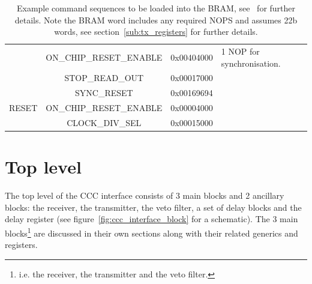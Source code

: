 \begin{table}
\begin{center}
\begin{tabular}{c|c|c|l}
              & ON\_CHIP\_RESET\_ENABLE  & 0x00404000 & 1 NOP for synchronisation. \\
              & STOP\_READ\_OUT          & 0x00017000 & \\
            \hline
            \multirow{3}{*}{RESET} 
              & SYNC\_RESET              & 0x00169694 & \\
              & ON\_CHIP\_RESET\_ENABLE  & 0x00004000 & \\
              & CLOCK\_DIV\_SEL          & 0x00015000 & \\
        \end{tabular}
        \end{center}
        \caption{Example command sequences to be loaded into the BRAM, see~\cite{lpd_manual} for further details. Note the BRAM word includes any required NOPS and assumes 22b words, see section~\ref{sub:tx_registers} for further details.}
        \label{tab:basic_tx_bram_vals}
    \end{table}
    \chapter{Top level} %
    \label{cha:top_level}
    The top level of the CCC interface consists of 3 main blocks and 2 ancillary blocks: the receiver, the transmitter, the veto filter, a set of delay blocks and the delay register (see figure~\ref{fig:ccc_interface_block} for a schematic). The 3 main blocks\footnote{i.e. the receiver, the transmitter and the veto filter.} are discussed in their own sections along with their related generics and registers.  
